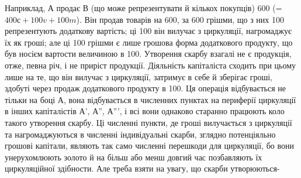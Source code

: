 Наприклад, А продає В (що може репрезентувати й кількох покупців)
600 (= $400 с + 100 v + 100 m$). Він продав товарів на 600, за
600 грішми, що з них 100 репрезентують додаткову вартість; ці
100 він вилучає з циркуляції, нагромаджує їх як гроші; але ці 100 грішми
є лише грошова форма додаткового продукту, що був носієм вартости
величиною в 100. Утворення скарбу взагалі не є продукція, отже, певна
річ, і не приріст продукції. Діяльність капіталіста сходить при цьому
лише на те, що він вилучає з циркуляції, затримує в себе й зберігає
гроші, здобуті через продаж додаткового продукту в 100. Ця операція
відбувається не тільки на боці А, вона відбувається в численних пунктах
на периферії циркуляції в інших капіталістів А', А'', А''', і всі вони однаково
старанно працюють коло такого утворення скарбу. Ці численні
пункти, де гроші вилучається з циркуляції та нагромаджуються в численні
індивідуальні скарби, зглядно потенціяльно грошові капітали, являють
так само численні перешкоди для циркуляції, бо вони унерухомлюють
золото й на більш або менш довгий час позбавляють їх циркуляційної
здібности. Але треба взяти на увагу, що скарби утворюються-
\parbreak{}  %
